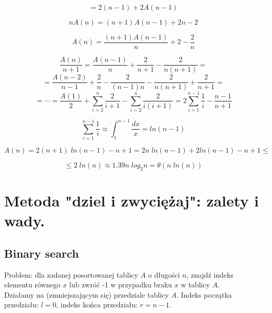 \documentclass[main.tex]{subfiles}
\begin{document}
    $$= 2(n - 1) + 2A(n - 1)$$

    $$nA(n) = (n + 1)A(n - 1) + 2n - 2$$

    $$A(n) = \frac{(n + 1)A(n - 1)}{n} + 2 - \frac{2}{n}$$

    $$\frac{A(n)}{n + 1} = \frac{A(n - 1)}{n} + \frac{2}{n + 1} - \frac{2}{n(n + 1)} = $$
    $$= \frac{A(n - 2)}{n - 1} + \frac{2}{n} - \frac{2}{(n - 1)n} - \frac{2}{n(n + 1)} + \frac{2}{n + 1} = $$
    $$ = \cdots = \frac{A(1)}{2} + \sum_{i = 2}^n \frac{2}{i + 1} - \sum_{i = 2}^n \frac{2}{i(i + 1)} =
    2\sum_{i = 1}^{n - 1} \frac{1}{i} - \frac{n - 1}{n + 1}$$

    $$\sum_{i = 1}^{n - 1} \frac{1}{i} \approx \int_1^{n - 1}\frac{dx}{x} = ln(n - 1)$$

    $$A(n) = 2(n + 1)\;ln(n - 1) - n + 1 = 2n\;ln(n - 1) + 2ln(n - 1) - n + 1 \leq$$

    $$\leq 2\;ln(n) \approx 1.39 n \; log_2 n = \theta(n\;ln(n))$$

    \newpage


    \section{Metoda "dziel i zwyciężaj": zalety i wady.}

    \subsection{Binary search}

    Problem: dla zadanej posortowanej tablicy $A$ o długości $n$, znajdź indeks elementu
    równego $x$ lub zwróć -1 w przypadku braku $x$ w tablicy $A$.
    \[\]
    Działamy na (zmniejszającym się) przedziale tablicy $A$. Indeks początka przedziału:
    $l = 0$, indeks końca przedziału: $r = n - 1$.
\end{document}
